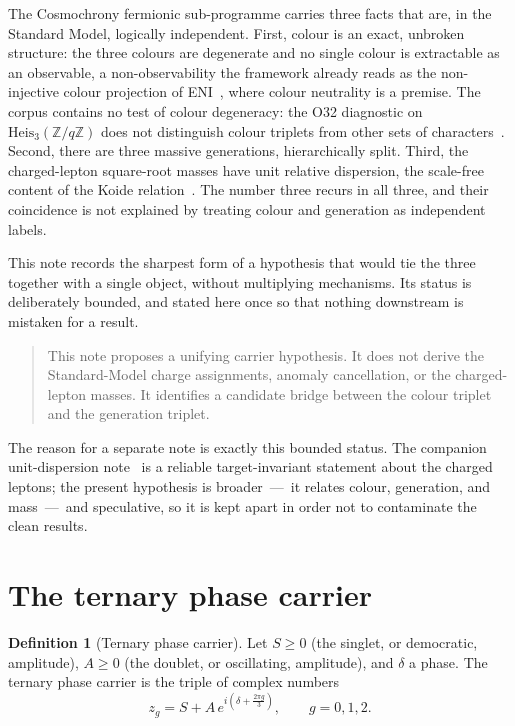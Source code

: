 \documentclass[11pt]{article}
\theoremstyle{definition}
\newtheorem{definition}{Definition}
\theoremstyle{remark}
\begin{document}
    The Cosmochrony fermionic sub-programme carries three facts that are, in the Standard Model, logically
    independent.
    First, colour is an exact, unbroken structure: the three colours are degenerate and no single colour is
    extractable as an observable, a non-observability the framework already reads as the non-injective colour
    projection of ENI~\cite{Beau2026l}, where colour neutrality is a premise.
    The corpus contains no test of colour degeneracy: the O32 diagnostic on $\mathrm{Heis}_3(\mathbb{Z}/q\mathbb{Z})$
    does not distinguish colour triplets from other sets of characters~\cite{Beau2026a36}.
    Second, there are three massive generations, hierarchically split.
    Third, the charged-lepton square-root masses have unit relative dispersion, the scale-free content of the
    Koide relation~\cite{Koide1982, Beau2026kud}.
    The number three recurs in all three, and their coincidence is not explained by treating colour and generation
    as independent labels.

    This note records the sharpest form of a hypothesis that would tie the three together with a single object,
    without multiplying mechanisms.
    Its status is deliberately bounded, and stated here once so that nothing downstream is mistaken for a result.

    \begin{quote}
      This note proposes a unifying carrier hypothesis.
      It does not derive the Standard-Model charge assignments, anomaly cancellation, or the charged-lepton
      masses.
      It identifies a candidate bridge between the colour triplet and the generation triplet.
    \end{quote}

    The reason for a separate note is exactly this bounded status.
    The companion unit-dispersion note~\cite{Beau2026kud} is a reliable target-invariant statement about the
    charged leptons; the present hypothesis is broader~---~it relates colour, generation, and mass~---~and
    speculative, so it is kept apart in order not to contaminate the clean results.

  \section{The ternary phase carrier}
    \label{sec:carrier}

    \begin{definition}[Ternary phase carrier]
      \label{def:carrier}
      Let $S \ge 0$ (the singlet, or democratic, amplitude), $A \ge 0$ (the doublet, or oscillating, amplitude),
      and $\delta$ a phase.
      The ternary phase carrier is the triple of complex numbers
      \begin{equation}
        \label{eq:carrier}
        z_g = S + A\,e^{i\left(\delta + \frac{2\pi g}{3}\right)}, \qquad g = 0, 1, 2 .
      \end{equation}
    \end{definition}
\end{document}
